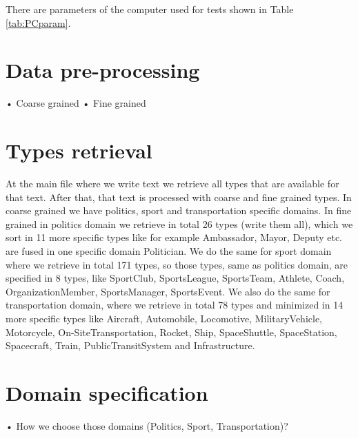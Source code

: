 \documentclass[thesis=M,english]{FITthesis}[2018/05/30]
\begin{document}
There are parameters of the computer used for tests shown in Table \ref{tab:PCparam}.

\section{Data pre-processing}
•	Coarse grained
•	Fine grained 

\section{Types retrieval}\label{}
At the main file where we write text we retrieve all types that are available for that text. After that, that text is processed with coarse and fine grained types. In coarse grained we have politics, sport and transportation specific domains. In fine grained in politics domain we retrieve in total 26 types (write them all), which we sort in 11 more specific types like for example Ambassador, Mayor, Deputy etc. are fused in one specific domain Politician. We do the same for sport domain where we retrieve in total 171 types, so those types, same as politics domain, are specified in 8 types, like SportClub, SportsLeague, SportsTeam, Athlete, Coach, OrganizationMember, SportsManager, SportsEvent. We also do the same for transportation domain, where we retrieve in total 78 types and minimized in 14 more specific types like Aircraft, Automobile, Locomotive, MilitaryVehicle, Motorcycle, On-SiteTransportation, Rocket, Ship, SpaceShuttle, SpaceStation, Spacecraft, Train, PublicTransitSystem and Infrastructure.  

\section{Domain specification}
•	How we choose those domains (Politics, Sport, Transportation)?
\end{document}
